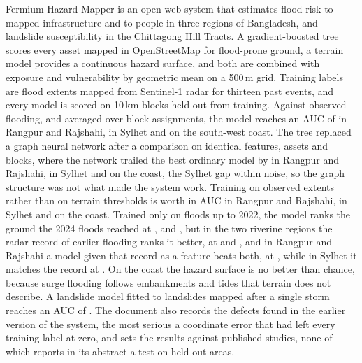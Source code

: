 Fermium Hazard Mapper is an open web system that estimates flood risk to mapped infrastructure and to people in three regions of Bangladesh, and landslide susceptibility in the Chittagong Hill Tracts. A gradient-boosted tree scores every asset mapped in OpenStreetMap for flood-prone ground, a terrain model provides a continuous hazard surface, and both are combined with exposure and vulnerability by geometric mean on a 500\,m grid. Training labels are flood extents mapped from Sentinel-1 radar for thirteen past events, and every model is scored on 10\,km blocks held out from training. Against observed flooding, and averaged over \RRBenchSeeds{} block assignments, the model reaches an AUC of \RRBenchBoostingAUC{} in Rangpur and Rajshahi, \SylhetBenchBoostingAUC{} in Sylhet and \CoastalBenchBoostingAUC{} on the south-west coast. The tree replaced a graph neural network after a comparison on identical features, assets and blocks, where the network trailed the best ordinary model by \RRBenchGap{} in Rangpur and Rajshahi, \SylhetBenchGap{} in Sylhet and \CoastalBenchGap{} on the coast, the Sylhet gap within noise, so the graph structure was not what made the system work. Training on observed extents rather than on terrain thresholds is worth \RRLabelGap{} in AUC in Rangpur and Rajshahi, \SylhetLabelGap{} in Sylhet and \CoastalLabelGap{} on the coast. Trained only on floods up to 2022, the model ranks the ground the 2024 floods reached at \RRTempAUC{}, \SylhetTempAUC{} and \CoastalTempAUC{}, but in the two riverine regions the radar record of earlier flooding ranks it better, at \RRTempPastAUC{} and \SylhetTempPastAUC{}, and in Rangpur and Rajshahi a model given that record as a feature beats both, at \RRPastFeatAUC{}, while in Sylhet it matches the record at \SylhetPastFeatAUC{}. On the coast the hazard surface is no better than chance, because surge flooding follows embankments and tides that terrain does not describe. A landslide model fitted to \CHTLandslides{} landslides mapped after a single storm reaches an AUC of \CHTLSAUC{}. The document also records the defects found in the earlier version of the system, the most serious a coordinate error that had left every training label at zero, and sets the results against published studies, none of which reports in its abstract a test on held-out areas.
